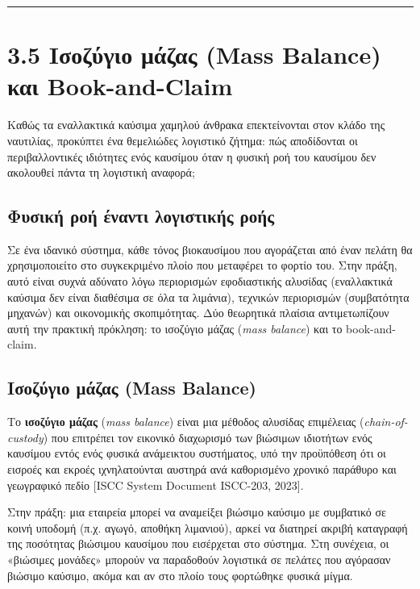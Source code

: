 \documentclass[11pt,a4paper,greek,twoside]{template-xe}
\begin{document}
\begin{center}\rule{0.5\linewidth}{0.5pt}\end{center}

\section{3.5 Ισοζύγιο μάζας (Mass Balance) και
Book-and-Claim}\label{ux3b9ux3c3ux3bfux3b6ux3cdux3b3ux3b9ux3bf-ux3bcux3acux3b6ux3b1ux3c2-mass-balance-ux3baux3b1ux3b9-book-and-claim}

Καθώς τα εναλλακτικά καύσιμα χαμηλού άνθρακα επεκτείνονται στον κλάδο
της ναυτιλίας, προκύπτει ένα θεμελιώδες λογιστικό ζήτημα: πώς
αποδίδονται οι περιβαλλοντικές ιδιότητες ενός καυσίμου όταν η φυσική ροή
του καυσίμου δεν ακολουθεί πάντα τη λογιστική αναφορά;

\subsection{Φυσική ροή έναντι λογιστικής
ροής}\label{ux3c6ux3c5ux3c3ux3b9ux3baux3ae-ux3c1ux3bfux3ae-ux3adux3bdux3b1ux3bdux3c4ux3b9-ux3bbux3bfux3b3ux3b9ux3c3ux3c4ux3b9ux3baux3aeux3c2-ux3c1ux3bfux3aeux3c2}

Σε ένα ιδανικό σύστημα, κάθε τόνος βιοκαυσίμου που αγοράζεται από έναν
πελάτη θα χρησιμοποιείτο στο συγκεκριμένο πλοίο που μεταφέρει το φορτίο
του. Στην πράξη, αυτό είναι συχνά αδύνατο λόγω περιορισμών εφοδιαστικής
αλυσίδας (εναλλακτικά καύσιμα δεν είναι διαθέσιμα σε όλα τα λιμάνια),
τεχνικών περιορισμών (συμβατότητα μηχανών) και οικονομικής σκοπιμότητας.
Δύο θεωρητικά πλαίσια αντιμετωπίζουν αυτή την πρακτική πρόκληση: το
ισοζύγιο μάζας (\emph{mass balance}) και το book-and-claim.

\subsection{Ισοζύγιο μάζας (Mass
Balance)}\label{ux3b9ux3c3ux3bfux3b6ux3cdux3b3ux3b9ux3bf-ux3bcux3acux3b6ux3b1ux3c2-mass-balance}

Το \textbf{ισοζύγιο μάζας} (\emph{mass balance}) είναι μια μέθοδος
αλυσίδας επιμέλειας (\emph{chain-of-custody}) που επιτρέπει τον εικονικό
διαχωρισμό των βιώσιμων ιδιοτήτων ενός καυσίμου εντός ενός φυσικά
ανάμεικτου συστήματος, υπό την προϋπόθεση ότι οι εισροές και εκροές
ιχνηλατούνται αυστηρά ανά καθορισμένο χρονικό παράθυρο και γεωγραφικό
πεδίο {[}ISCC System Document ISCC-203, 2023{]}.

Στην πράξη: μια εταιρεία μπορεί να αναμείξει βιώσιμο καύσιμο με
συμβατικό σε κοινή υποδομή (π.χ. αγωγό, αποθήκη λιμανιού), αρκεί να
διατηρεί ακριβή καταγραφή της ποσότητας βιώσιμου καυσίμου που εισέρχεται
στο σύστημα. Στη συνέχεια, οι «βιώσιμες μονάδες» μπορούν να παραδοθούν
λογιστικά σε πελάτες που αγόρασαν βιώσιμο καύσιμο, ακόμα και αν στο
πλοίο τους φορτώθηκε φυσικά μίγμα.
\end{document}
